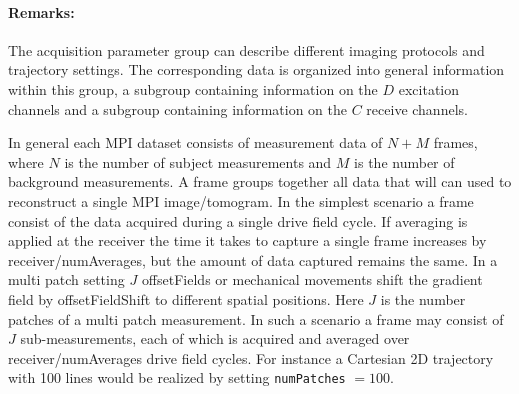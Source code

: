 \documentclass[landscape,a4paper]{article} %
\newcommand{\inl}[1]{\lstinline[columns=fixed]{#1}}
\newcommand{\inlvar}[1]{{\ttfamily#1}}
\begin{document}
\begin{multicols}{2}
\paragraph{Remarks:} The acquisition parameter group can describe different imaging protocols and trajectory settings. The corresponding data is organized into general information within this group, a subgroup containing information on the $D$ excitation channels and a subgroup containing information on the $C$ receive channels.

In general each MPI dataset consists of measurement data of $N+M$ frames, where $N$ is the number of subject measurements and $M$ is the number of background measurements. A frame groups together all data that will can used to reconstruct a single MPI image/tomogram. In the simplest scenario a frame consist of the data acquired during a single drive field cycle. If averaging is applied at the receiver the time it takes to capture a single frame increases by \inlvar{receiver/numAverages}, but the amount of data captured remains the same. In a multi patch setting $J$ \inlvar{offsetField}s or mechanical movements shift the gradient field by \inlvar{offsetFieldShift} to different spatial positions. Here $J$ is the number patches of a multi patch measurement. In such a scenario a frame may consist of $J$ sub-measurements, each of which is acquired and averaged over \inlvar{receiver/numAverages} drive field cycles. For instance a Cartesian 2D trajectory with 100 lines would be realized by setting \inl{numPatches} $ = 100$.
\end{multicols}
\end{document}
